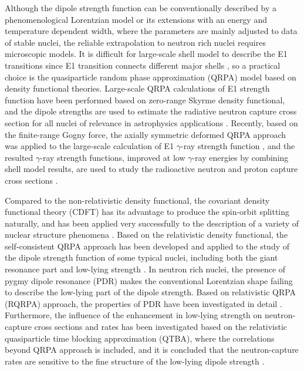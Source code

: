 \documentclass[prc,twocolumn,twoside,showpacs,superscriptaddress,floatfix]{revtex4-1}
\begin{document}
Although the dipole strength function can be conventionally described by a
phenomenological Lorentzian model or its extensions with an energy and
temperature dependent width\cite{Capote2009, Nucl_Data_Sheets_110_3107}, where
the parameters are mainly adjusted to data of stable nuclei, the reliable
extrapolation to neutron rich nuclei requires microscopic models. It is
difficult for large-scale shell model to describe the E1 transitions since E1
transition connects different major shells \cite{Placeholder:08}, so a
practical choice is the quasiparticle random phase approximation (QRPA) model
based on density functional theories. Large-scale QRPA calculations of E1
strength function have been performed based on zero-range Skyrme density
functional, and the dipole strengths are used to estimate the radiative neutron
capture cross section for all nuclei of relevance in astrophysics applications
\cite{Goriely2002, Goriely2004}. Recently, based on the finite-range Gogny
force, the axially symmetric deformed QRPA approach was applied to the
large-scale calculation of E1 $\gamma$-ray strength function
\cite{Martini2016}, and the resulted $\gamma$-ray strength functions, improved
at low $\gamma$-ray energies by combining shell model results, are used to
study the radioactive neutron and proton capture cross sections
\cite{Goriely2018}.

Compared to the non-relativistic density functional, the covariant density
functional theory (CDFT) has its advantage to produce the spin-orbit splitting
naturally, and has been applied very successfully to the description of a
variety of nuclear structure phenomena \cite{Placeholder:09}. Based on the
relativistic density functional, the self-consistent QRPA approach has been
developed and applied to the study of the dipole strength function of some
typical nuclei, including both the giant resonance part and low-lying strength
\cite{Paar2003}. In neutron rich nuclei, the presence of pygmy dipole resonance
(PDR) \cite{Paar2007} makes the conventional Lorentzian shape failing to
describe the low-lying part of the dipole strength. Based on relativistic QRPA
(RQRPA) approach, the properties of PDR have been investigated in detail
\cite{Niu, Vretenar}. Furthermore, the influence of the enhancement in
low-lying strength on neutron-capture cross sections and rates has been
investigated based on the relativistic quasiparticle time blocking
approximation (QTBA), where the correlations beyond QRPA approach is included,
and it is concluded that the neutron-capture rates are sensitive to the fine
structure of the low-lying dipole strength \cite{Litvinova_2009}.
\end{document}
